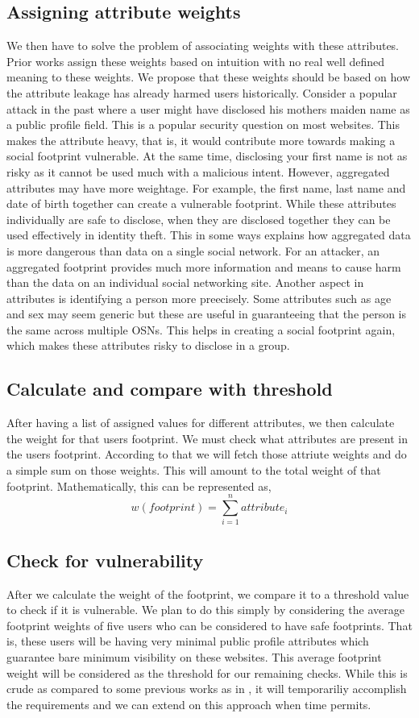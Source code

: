\documentclass[conference]{IEEEtran}
\begin{document}
\subsection{Assigning attribute weights}
We then have to solve the problem of associating weights with these attributes. Prior works assign these weights based on intuition with no real well defined meaning to these weights. We propose that these weights should be based on how the attribute leakage has already harmed users historically. Consider a popular attack in the past where a user might have disclosed his mothers maiden name as a public profile field. This is a popular security question on most websites. This makes the attribute heavy, that is, it would contribute more towards making a social footprint vulnerable. At the same time, disclosing your first name is not as risky as it cannot be used much with a malicious intent. However, aggregated attributes may have more weightage. For example, the first name, last name and date of birth together can create a vulnerable footprint. While these attributes individually are safe to disclose, when they are disclosed together they can be used effectively in identity theft. This in some ways explains how aggregated data is more dangerous than data on a single social network. For an attacker, an aggregated footprint provides much more information and means to cause harm than the data on an individual social networking site. Another aspect in attributes is identifying a person more preecisely. Some attributes such as age and sex may seem generic but these are useful in guaranteeing that the person is the same across multiple OSNs. This helps in creating a social footprint again, which makes these attributes risky to disclose in a group.
\subsection{Calculate and compare with threshold}
After having a list of assigned values for different attributes, we then calculate the weight for that users footprint. We must check what attributes are present in the users footprint. According to that we will fetch those attriute weights and do a simple sum on those weights. This will amount to the total weight of that footprint.
Mathematically, this can be represented as,
\begin{equation}
w(footprint) = \sum_{i=1}^{n}attribute_i
\end{equation}
\subsection{Check for vulnerability}
After we calculate the weight of the footprint, we compare it to a threshold value to check if it is vulnerable. We plan to do this simply by considering the average footprint weights of five users who can be considered to have safe footprints. That is, these users will be having very minimal public profile attributes which guarantee bare minimum visibility on these websites. This average footprint weight will be considered as the threshold for our remaining checks. While this is crude as compared to some previous works as in \cite{pidx}, it will temporariliy accomplish the requirements and we can extend on this approach when time permits.
\end{document}
